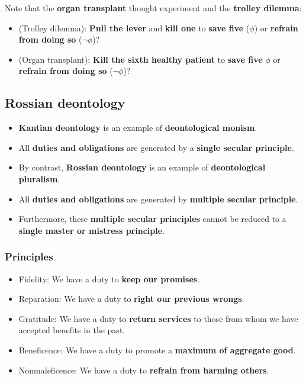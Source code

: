 \documentclass[11pt]{article}
\begin{document}
Note that the \textbf{organ transplant} thought experiment and the \textbf{trolley dilemma}:
\begin{itemize}
\item (Trolley dilemma): \textbf{Pull the lever} and \textbf{kill one} to \textbf{save five} (\(\phi\)) or \textbf{refrain from doing so} (\(\neg \phi\))?
\item (Organ transplant): \textbf{Kill the sixth healthy patient} to \textbf{save five} \(\phi\) or \textbf{refrain from doing so} (\(\neg \phi\))?
\end{itemize}
\subsection{Rossian deontology}
\label{sec:org361e0a1}
\begin{itemize}
\item \textbf{Kantian deontology} is an example of \textbf{deontological monism}.
\item All \textbf{duties and obligations} are generated by a \textbf{single secular principle}.
\item By contrast, \textbf{Rossian deontology} is an example of \textbf{deontological pluralism}.
\item All \textbf{duties and obligations} are generated by \textbf{multiple secular principle}.
\item Furthermore, these \textbf{multiple secular principles} cannot be reduced to a \textbf{single master or mistress principle}.
\end{itemize}
\subsubsection{Principles}
\label{sec:org82d9c57}
\begin{itemize}
\item Fidelity:
We have a duty to \textbf{keep our promises}.
\item Reparation:
We have a duty to \textbf{right our previous wrongs}.
\item Gratitude:
We have a duty to \textbf{return services} to those from whom we have accepted benefits in the past.
\item Beneficence:
We have a duty to promote a \textbf{maximum of aggregate good}.
\item Nonmaleficence:
We have a duty to \textbf{refrain from harming others}.
\end{itemize}

 \newpage
\end{document}
